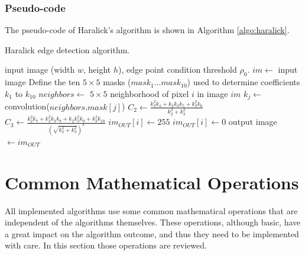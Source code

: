 \documentclass{ipol}
\numberwithin{equation}{section}
\numberwithin{table}{section}
\begin{document}
\subsubsection{Pseudo-code}

The pseudo-code of Haralick's algorithm is shown in Algorithm \ref{algo:haralick}.

\begin{algorithm}[t]
\caption{Haralick edge detection algorithm.}
\label{algo:haralick}
\begin{algorithmic}[1]
\REQUIRE input image (width $w$, height $h$), edge point condition threshold $\rho_0$.
\STATE $im \leftarrow$ input image
\STATE Define the ten $5\times5$ masks ($mask_1\dots mask_{10}$) used to determine coefficients $k_1$ to $k_{10}$ 
	\STATE $neighbors \leftarrow$ $5\times5$ neighborhood of pixel $i$ in image $im$
		\STATE $k_j \leftarrow$ convolution($neighbors$,$mask[j]$)
	\ENDFOR
	\STATE $C_2 \leftarrow \frac{k_2^2k_4 + k_2k_3k_5 + k_3^2k_6}{k_2^2 + k_3^2}$
	\STATE $C_3 \leftarrow \frac{k_2^3k_7 + k_2^2k_3k_8 + k_2k_3^2k_9 + k_3^3k_{10}}{(\sqrt{k_2^2 + k_3^2})^3}$
		\STATE $im_{OUT}[i] \leftarrow 255$
	\ELSE
		\STATE $im_{OUT}[i] \leftarrow 0$
	\ENDIF
\ENDFOR
\RETURN output image $\leftarrow im_{OUT}$
\end{algorithmic}
\end{algorithm}


\section{Common Mathematical Operations}
\label{sec:appendix1}

All implemented algorithms use some common mathematical operations that are independent of the algorithms themselves. 
These operations, although basic, have a great impact on the algorithm outcome, and thus they need to be 
implemented with care. In this section those operations are reviewed.


\end{document}
